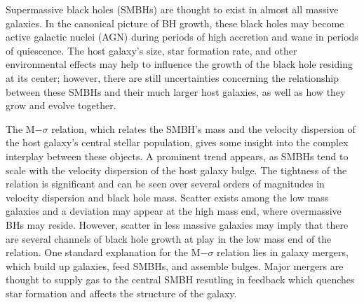 \documentclass[manuscript]{aastex}
\begin{document}

Supermassive black holes (SMBHs) are thought to exist in almost all massive galaxies. \citep{Kormendy2013} In the canonical picture of BH growth, these black holes may become active galactic nuclei (AGN) during periods of high accretion and wane in periods of quiescence. \citep{Alexander2005,Papovich2006,Volonteri2012} The host galaxy's size, star formation rate, and other environmental effects may help to influence the growth of the black hole residing at its center; however, there are still uncertainties concerning the relationship between these SMBHs and their much larger host galaxies, as well as how they grow and evolve together. \citep[5-8 citations here]{Haehnelt2000,DiMatteo2005,Hopkins2006,Fu2008,Sijacki2009,Silverman2009,Mullaney2012}

The M$-\sigma$ relation, which relates the SMBH's mass and the velocity dispersion of the host galaxy's central stellar population, gives some insight into the complex interplay between these objects. \citep{Ferrarese2000} A prominent trend appears, as SMBHs tend to scale with the velocity dispersion of the host galaxy bulge. %
The tightness of the relation is significant and can be seen over several orders of magnitudes in velocity dispersion and black hole mass. \citep{Merritt2001,Graham2011,Mcconnell2013,Kormendy2013} Scatter exists among the low mass galaxies and a deviation may appear at the high mass end, where overmassive BHs may reside. \citep{VanDenBosch2007,Moster2010,Natarajan2011} However, scatter in less massive galaxies may imply that there are several channels of black hole growth at play in the low mass end of the relation. \citep{Micic2007,Volonteri2009,Reines2013,Graham2014} One standard explanation for the M$-\sigma$ relation lies in galaxy mergers, which build up galaxies, feed SMBHs, and assemble bulges. \citep{DiMatteo2005,Shen2008} Major mergers are thought to supply gas to the central SMBH resutling in feedback which quenches star formation and affects the structure of the galaxy. 

\end{document}
